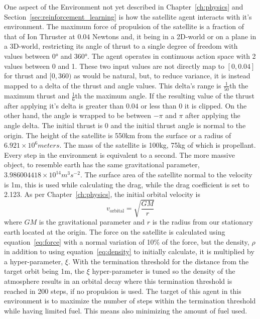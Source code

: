 One aspect of the Environment not yet described in Chapter~\ref{ch:physics} and Section~\ref{sec:reinforcement_learning} is how the satellite agent interacts with it's environment. The maximum force of propulsion of the satellite is a fraction of that of Ion Thruster at $0.04$ Newtons and, it being in a 2D-world or on a plane in a 3D-world, restricting its angle of thrust to a single degree of freedom with values between 0\si{\degree} and 360\si{\degree}. The agent operates in continuous action space with 2 values between 0 and 1. These two input values are not directly map to $[0, 0.04]$ for thrust and $[0, 360)$ as would be natural, but, to reduce variance, it is instead mapped to a delta of the thrust and angle values. This delta's range is $\frac{1}{50}$th the maximum thrust and $\frac{1}{6}$th the maximum angle. If the resulting value of the thrust after applying it's delta is greater than $0.04$ or less than $0$ it is clipped. On the other hand, the angle is wrapped to be between $-\pi$ and $\pi$ after applying the angle delta. The initial thrust is 0 and the initial thrust angle is normal to the origin. The height of the satellite is 550\si{km} from the surface or a radius of $6.921\times 10^6\si{meters}$. The mass of the satellite is 100\si{kg}, 75\si{kg} of which is propellant. Every step in the environment is equivalent to a second. The more massive object, to resemble earth has the same gravitational parameter, $3.986004418\times 10^{14}\si{m^3s^{-2}}$. The surface area of the satellite normal to the velocity is 1\si{m}, this is used while calculating the drag, while the drag coefficient is set to 2.123. As per Chapter~\ref{ch:physics}, the initial orbital velocity is $$v_{\text{orbital}}=\sqrt{\frac{GM}{r}}$$ where $GM$ is the gravitational parameter and $r$ is the radius from our stationary earth located at the origin. The force on the satellite is calculated using equation~\ref{eq:force} with a normal variation of 10\% of the force, but the density, $\rho$ in addition to using equation~\ref{eq:density} to initially calculate, it is multiplied by a hyper-parameter, $\xi$. With the termination threshold for the distance from the target orbit being 1\si{m}, the $\xi$ hyper-parameter is tuned so the density of the atmosphere results in an orbital decay where this termination threshold is reached in 200 steps, if no propulsion is used. The target of this agent in this environment is to maximize the number of steps within the termination threshold while having limited fuel. This means also minimizing the amount of fuel used.

